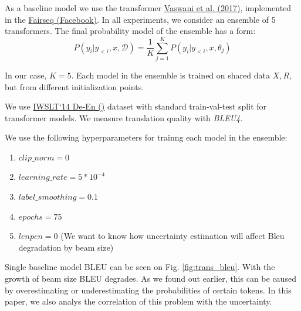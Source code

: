 \documentclass[a4paper,14pt]{extarticle}
\newcommand{\bibref}[3]{\hyperlink{#1}{#2 (#3)}}
\begin{document}
	As a baseline model we use the transformer \bibref{transformer}{Vaswani et al.} {2017}, implemented in the \bibref{fairseq}{Fairseq}{Facebook}. In all experiments, we consider an ensemble of 5 transformers. The final probability model of the ensemble has a form:
	\begin{equation*}
		P(y_i | y_{<i}, x, \mathcal{D}) = \frac1{K} \sum_{j=1}^{K}P(y_i | y_{<i}, x, \theta_j)
	\end{equation*}
	
	In our case, $K=5$. Each model in the ensemble is trained on shared data $X, R$, but from different initialization points.

	We use \bibref{iwslt}{IWSLT`14 De-En}{} dataset with standard train-val-test split for transformer models. We measure translation quality with \textit{BLEU4}.
	
	\begin{figure}[t]
	\end{figure}
	
	We use the following hyperparameters for trainng each model in the ensemble:
	\begin{enumerate}
		\item $clip\_norm = 0$
		\item $learning\_rate=5*10^{-4}$
		\item $label\_smoothing=0.1$
		\item $epochs=75$
		\item $lenpen=0$ (We want to know how uncertainty estimation will affect Bleu degradation by beam size)
	\end{enumerate}
	
	Single baseline model BLEU can be seen on Fig. \ref{fig:trans_bleu}. With the growth of beam size BLEU degrades. As we found out earlier, this can be caused by overestimating or underestimating the probabilities of certain tokens. In this paper, we also analys the correlation of this problem with the uncertainty.
	
\end{document}
